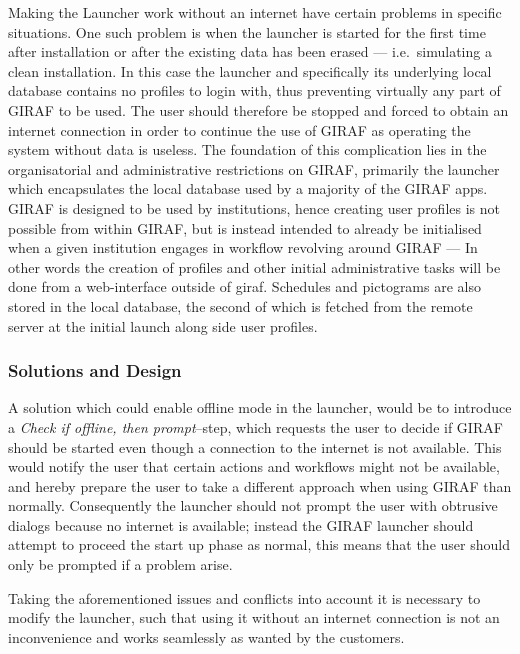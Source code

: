 \bigskip \noindent
Making the Launcher work without an internet have certain problems in specific situations.
One such problem is when the launcher is started for the first time after installation or after the existing data has been erased --- i.e.\ simulating a clean installation. 
In this case the launcher and specifically its underlying local database contains no profiles to login with, thus preventing virtually any part of GIRAF to be used. 
The user should therefore be stopped and forced to obtain an internet connection in order to continue the use of GIRAF as operating the system without data is useless. 
The foundation of this complication lies in the organisatorial and administrative restrictions on GIRAF, primarily the launcher which encapsulates the local database used by a majority of the GIRAF apps.
GIRAF is designed to be used by institutions, hence creating user profiles is not possible from within GIRAF, but is instead intended to already be initialised when a given institution engages in workflow revolving around GIRAF --- In other words the creation of profiles and other initial administrative tasks will be done from a web-interface outside of giraf.
Schedules and pictograms are also stored in the local database, the second of which is fetched from the remote server at the initial launch along side user profiles.

\subsubsection{Solutions and Design}
A solution which could enable offline mode in the launcher, would be to introduce a \textit{Check if offline, then prompt}--step, which requests the user to decide if GIRAF should be started even though a connection to the internet is not available.
This would notify the user that certain actions and workflows might not be available, and hereby prepare the user to take a different approach when using GIRAF than normally.
Consequently the launcher should not prompt the user with obtrusive dialogs because no internet is available; instead the GIRAF launcher should attempt to proceed the start up phase as normal, this means that the user should only be prompted if a problem arise.

\bigskip \noindent
Taking the aforementioned issues and conflicts into account it is necessary to modify the launcher, such that using it without an internet connection is not an inconvenience and works seamlessly as wanted by the customers. 

